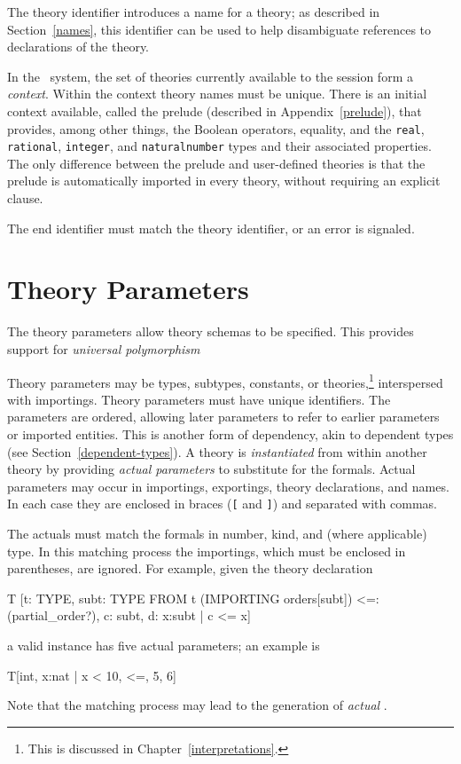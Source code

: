 The theory identifier introduces a name for a theory; as described in
Section~\ref{names}, this identifier can be used to help disambiguate
references to declarations of the theory.

In the \pvs\ system, the set of theories currently available to the
session form a \emph{context}.  Within the context theory names must be
unique.  There is an initial context available, called the prelude
(described in Appendix~\ref{prelude}), that provides, among other things,
the Boolean operators, equality, and the \texttt{real}, \texttt{rational},
\texttt{integer}, and \texttt{naturalnumber} types and their associated
properties.  The only difference between the prelude and user-defined
theories is that the prelude is automatically imported in every theory,
without requiring an explicit  clause.

The end identifier must match the theory identifier, or an error is
signaled.


\section{Theory Parameters}\label{parameters}

The theory parameters allow theory schemas to be specified.  This
provides support for \emph{universal polymorphism}

Theory parameters may be types, subtypes, constants, or
theories,\footnote{This is discussed in Chapter~\ref{interpretations}.}
interspersed with importings.  Theory parameters must have unique
identifiers.  The parameters are ordered, allowing later parameters to
refer to earlier parameters or imported entities.  This is another form of
dependency, akin to dependent types (see Section~\ref{dependent-types}).
A theory is \emph{ instantiated} from within another theory by providing
\emph{actual parameters} to substitute for the
formals.  Actual parameters may occur in importings, exportings, theory
declarations, and names.  In each case they are enclosed in braces
(\texttt{[} and \texttt{]}) and separated with commas.

The actuals must match the formals in number, kind, and (where
applicable) type.  In this matching process the importings, which
must be enclosed in parentheses, are ignored.  For example, given the
theory declaration
\begin{pvsex}
  T [t: TYPE,
     subt: TYPE FROM t
     (IMPORTING orders[subt]) <=: (partial_order?),
     c: subt,
     d: \setb{}x:subt | c <= x\sete]
\end{pvsex}
a valid instance has five actual parameters; an example is
\begin{pvsex}
  T[int, \setb{}x:nat | x < 10\sete, <=, 5, 6]
\end{pvsex}
%
Note that the matching process may lead to the generation of \emph{actual}
\tccs.

